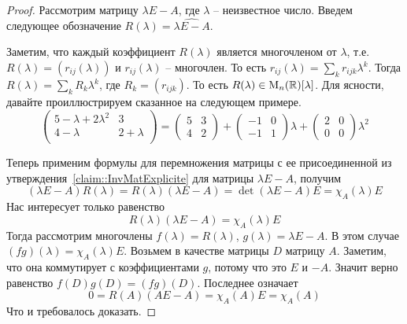 \begin{proof}
Рассмотрим матрицу $\lambda E - A$, где $\lambda$ -- неизвестное число.
Введем следующее обозначение $R(\lambda) = \widehat{\lambda E - A}$.

Заметим, что каждый коэффициент $R(\lambda)$ является многочленом от $\lambda$, т.е. $R(\lambda) = (r_{ij}(\lambda))$ и $r_{ij}(\lambda)$ -- многочлен.
То есть $r_{ij}(\lambda) = \sum_k r_{ijk}\lambda^k$.
Тогда $R(\lambda) = \sum_k R_k \lambda^k$, где $R_k=(r_{ijk})$.
То есть $R(\lambda)\in\operatorname{M}_{n}(\mathbb R)[\lambda]$.
Для ясности, давайте проиллюстрируем сказанное на следующем примере.
\[
\begin{pmatrix}
{5 - \lambda + 2 \lambda^2}&{3}\\
{4 - \lambda}&{2 + \lambda}\\
\end{pmatrix}
=
\begin{pmatrix}
{5}&{3}\\
{4}&{2}
\end{pmatrix}
+
\begin{pmatrix}
{-1}&{0}\\
{-1}&{1}
\end{pmatrix}
\lambda
+
\begin{pmatrix}
{2}&{0}\\
{0}&{0}
\end{pmatrix}
\lambda^2
\]

Теперь применим формулы для перемножения матрицы с ее присоединенной из утверждения~\ref{claim::InvMatExplicite} для матрицы $\lambda E - A$, получим 
\[
(\lambda E - A)R(\lambda) = R(\lambda)(\lambda E - A) = \det(\lambda E - A)E=\chi_A(\lambda)E
\]
Нас интересует только равенство
\[
R(\lambda)(\lambda E - A) = \chi_A(\lambda)E
\]
Тогда рассмотрим многочлены $f(\lambda) = R(\lambda)$, $g(\lambda) = \lambda E  - A$.
В этом случае $(fg)(\lambda) = \chi_A(\lambda)E$.
Возьмем в качестве матрицы $D$ матрицу $A$.
Заметим, что она коммутирует с коэффициентами $g$, потому что это $E$ и $-A$.
Значит верно равенство $f(D)g(D) = (fg)(D)$.
Последнее означает
\[
0 = R(A)(A E - A) = \chi_A(A) E = \chi_A(A)
\]
Что и требовалось доказать.
\end{proof}
